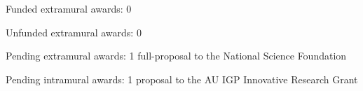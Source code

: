 \begin{tightItemize}
    \item Funded extramural awards: 0
    \item Unfunded extramural awards: 0
    \item Pending extramural awards: 1 full-proposal to the National Science Foundation
    \item Pending intramural awards: 1 proposal to the AU IGP Innovative Research Grant
\end{tightItemize}
